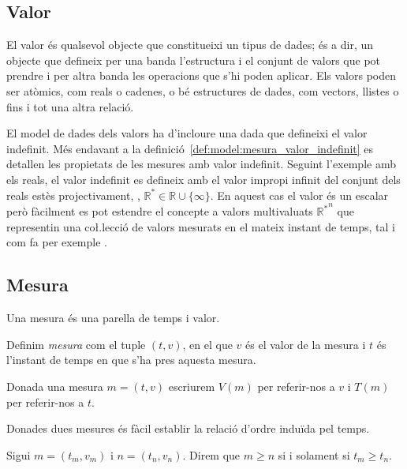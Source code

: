 \subsection{Valor}

El valor és qualsevol objecte que constitueixi un tipus de dades; és a dir, un objecte que defineix per una banda l'estructura i el conjunt de valors que pot prendre i per altra banda les operacions que s'hi poden aplicar. Els valors poden ser atòmics, com reals o cadenes, o bé estructures de dades, com vectors, llistes o fins i tot una altra relació.

El model de dades dels valors ha d'incloure una dada que defineixi el valor indefinit. Més endavant a la definició~\ref{def:model:mesura_valor_indefinit} es detallen les propietats de les mesures amb valor indefinit. Seguint l'exemple amb els reals, el valor indefinit es defineix amb el valor impropi infinit del conjunt dels reals estès projectivament, \parencite{cantrell:projectivelyextendedreal}, $\mathbb{R}^*\in\mathbb{R} \cup \{\infty\}$.  En aquest cas el valor és un escalar però fàcilment es pot estendre el concepte a valors multivaluats ${\mathbb{R}^*}^n$ que representin una co\l.lecció de valors mesurats en el mateix instant de temps, tal i com fa per exemple \textcite{assfalg08:thesis}. 





\subsection{Mesura}\label{sec:model:mesura} 

Una mesura és una parella de temps i valor.

\begin{definition}[Mesura]
  \label{def:model:mesura}
  Definim \emph{mesura} com el tuple $(t,v)$, en el que $v$ és el
  valor de la mesura i $t$ és l'instant de temps en que s'ha pres
  aquesta mesura.
\end{definition}


Donada una mesura $m=(t,v)$ escriurem $V(m)$ per referir-nos a $v$ i
$T(m)$ per referir-nos a $t$.

Donades dues mesures és fàcil establir la relació d'ordre induïda pel
temps.

\begin{definition}
  \label{def:model:mesura-relacio-ordre}
  Sigui $m=(t_m,v_m)$ i $n=(t_n,v_n)$. Direm que $m\geq n$ si i solament
  si $t_m\geq t_n$.
\end{definition}


